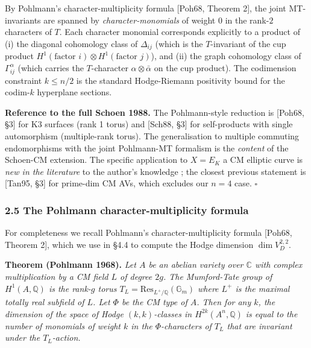 \documentclass[
  11pt,
  a4paper,
]{amsart}
\begin{document}
By Pohlmann's character-multiplicity formula {[}Poh68, Theorem 2{]}, the joint MT-invariants are spanned by \emph{character-monomials} of weight \(0\) in the rank-\(2\) characters of \(T\). Each character monomial corresponds explicitly to a product of (i) the diagonal cohomology class of \(\Delta_{ij}\) (which is the \(T\)-invariant of the cup product \(H^1(\text{factor }i) \otimes H^1(\text{factor }j)\)), and (ii) the graph cohomology class of \(\Gamma_{ij}^\alpha\) (which carries the \(T\)-character \(\alpha \otimes \bar\alpha\) on the cup product). The codimension constraint \(k \leq n/2\) is the standard Hodge-Riemann positivity bound for the codim-\(k\) hyperplane sections.

\textbf{Reference to the full Schoen 1988.} The Pohlmann-style reduction is {[}Poh68, §3{]} for K3 surfaces (rank 1 torus) and {[}Sch88, §3{]} for self-products with single automorphism (multiple-rank torus). The generalisation to multiple commuting endomorphisms with the joint Pohlmann-MT formalism is the \emph{content} of the Schoen-CM extension. The specific application to \(X = E_K\) a CM elliptic curve is \emph{new in the literature} to the author's knowledge ; the closest previous statement is {[}Tan95, §3{]} for prime-dim CM AVs, which excludes our \(n = 4\) case. \(\square\)

\hypertarget{the-pohlmann-character-multiplicity-formula}{%
\subsubsection{2.5 The Pohlmann character-multiplicity formula}\label{the-pohlmann-character-multiplicity-formula}}

For completeness we recall Pohlmann's character-multiplicity formula {[}Poh68, Theorem 2{]}, which we use in §4.4 to compute the Hodge dimension \(\dim V_D^{2,2}\).

\textbf{Theorem (Pohlmann 1968).} \emph{Let \(A\) be an abelian variety over \(\mathbb{C}\) with complex multiplication by a CM field \(L\) of degree \(2g\). The Mumford-Tate group of \(H^1(A, \mathbb{Q})\) is the rank-\(g\) torus \(T_L = \mathrm{Res}_{L^+/\mathbb{Q}}(\mathbb{G}_m)\) where \(L^+\) is the maximal totally real subfield of \(L\). Let \(\Phi\) be the CM type of \(A\). Then for any \(k\), the dimension of the space of Hodge \((k,k)\)-classes in \(H^{2k}(A^n, \mathbb{Q})\) is equal to the number of monomials of weight \(k\) in the \(\Phi\)-characters of \(T_L\) that are invariant under the \(T_L\)-action.}
\end{document}
